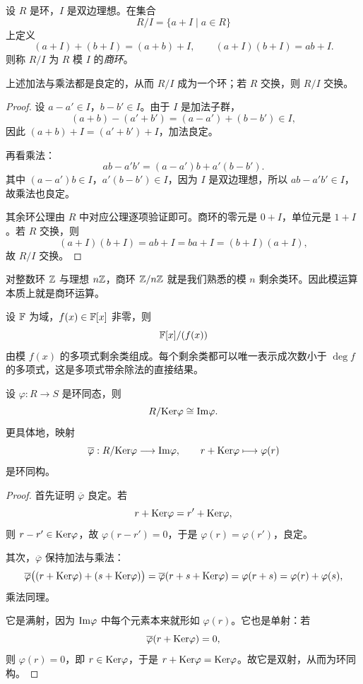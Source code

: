 \begin{definition}
设 $R$ 是环，$I$ 是双边理想。在集合
\[
R/I=\{a+I\mid a\in R\}
\]
上定义
\[
(a+I)+(b+I)=(a+b)+I,
\qquad
(a+I)(b+I)=ab+I.
\]
则称 $R/I$ 为 $R$ 模 $I$ 的\emph{商环}。
\end{definition}

\begin{proposition}
上述加法与乘法都是良定的，从而 $R/I$ 成为一个环；若 $R$ 交换，则 $R/I$ 交换。
\end{proposition}

\begin{proof}
设 $a-a'\in I$，$b-b'\in I$。由于 $I$ 是加法子群，
\[
(a+b)-(a'+b')=(a-a')+(b-b')\in I,
\]
因此 $(a+b)+I=(a'+b')+I$，加法良定。

再看乘法：
\[
ab-a'b'=(a-a')b+a'(b-b').
\]
其中 $(a-a')b\in I$，$a'(b-b')\in I$，因为 $I$ 是双边理想，所以 $ab-a'b'\in I$，故乘法也良定。

其余环公理由 $R$ 中对应公理逐项验证即可。商环的零元是 $0+I$，单位元是 $1+I$。若 $R$ 交换，则
\[
(a+I)(b+I)=ab+I=ba+I=(b+I)(a+I),
\]
故 $R/I$ 交换。
\end{proof}

\begin{example}
对整数环 $\mathbb{Z}$ 与理想 $n\mathbb{Z}$，商环 $\mathbb{Z}/n\mathbb{Z}$ 就是我们熟悉的模 $n$ 剩余类环。因此模运算本质上就是商环运算。
\end{example}

\begin{example}
设 $\mathbb{F}$ 为域，$f(x)\in\mathbb{F}[x]$ 非零，则
\[
\mathbb{F}[x]/(f(x))
\]
由模 $f(x)$ 的多项式剩余类组成。每个剩余类都可以唯一表示成次数小于 $\deg f$ 的多项式，这是多项式带余除法的直接结果。
\end{example}

\begin{theorem}[第一同构定理]
设 $\varphi:R\to S$ 是环同态，则
\[
R/\mathrm{Ker}\varphi\cong \mathrm{Im}\varphi.
\]
更具体地，映射
\[
\overline{\varphi}:R/\mathrm{Ker}\varphi\longrightarrow \mathrm{Im}\varphi,
\qquad
r+\mathrm{Ker}\varphi\longmapsto \varphi(r)
\]
是环同构。
\end{theorem}

\begin{proof}
首先证明 $\overline{\varphi}$ 良定。若
\[
r+\mathrm{Ker}\varphi=r'+\mathrm{Ker}\varphi,
\]
则 $r-r'\in\mathrm{Ker}\varphi$，故 $\varphi(r-r')=0$，于是 $\varphi(r)=\varphi(r')$，良定。

其次，$\overline{\varphi}$ 保持加法与乘法：
\[
\overline{\varphi}\bigl((r+\mathrm{Ker}\varphi)+(s+\mathrm{Ker}\varphi)\bigr)
=\overline{\varphi}(r+s+\mathrm{Ker}\varphi)=\varphi(r+s)=\varphi(r)+\varphi(s),
\]
乘法同理。

它是满射，因为 $\mathrm{Im}\varphi$ 中每个元素本来就形如 $\varphi(r)$。它也是单射：若
\[
\overline{\varphi}(r+\mathrm{Ker}\varphi)=0,
\]
则 $\varphi(r)=0$，即 $r\in\mathrm{Ker}\varphi$，于是 $r+\mathrm{Ker}\varphi=\mathrm{Ker}\varphi$。故它是双射，从而为环同构。
\end{proof}

